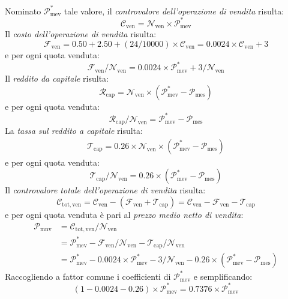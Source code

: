 \documentclass[12pt,a4paper]{article}
\newcommand{\CalcoloCostoOperazioneSim}[1]{\num{0,50} + \num{2,50} + \left(\num{24}/\num{10000}\right) \times{} #1}
\newcommand{\Nven}[1]{\mathcal{N}_{\textrm{ven}#1}}
\newcommand{\Pme}[1]{\mathcal{P}_{\mathrm{me}#1}}
\newcommand{\Pmes}[1]{\Pme{\mathrm{s}#1}}
\newcommand{\Pmnv}[1]{\mathcal{P}_{\mathrm{mnv}#1}}
\newcommand{\Plimmev}{\mathcal{P}_{\mathrm{mev}}^{*}}
\newcommand{\Cven}[1]{\mathcal{C}_{\mathrm{ven}#1}}
\newcommand{\Ctotven}[1]{\mathcal{C}_{\mathrm{tot,ven}#1}}
\newcommand{\Rcap}[1]{\mathcal{R}_{\mathrm{cap}#1}}
\newcommand{\Tredcap}[1]{\mathcal{T}_{\mathrm{cap}#1}}
\newcommand{\Fven}[1]{\mathcal{F}_{\mathrm{ven}#1}}
\begin{document}
Nominato \(\Plimmev{}\) tale valore, il \emph{controvalore dell'operazione di vendita} risulta:
\begin{equation*}
  \Cven{} = \Nven{} \times{} \Plimmev{}
\end{equation*}
Il \emph{costo dell'operazione di vendita} risulta:
\begin{equation*}
  \Fven{}
  = \CalcoloCostoOperazioneSim{\Cven{}}
  = \num{0,0024} \times{} \Cven{} + \num{3}
\end{equation*}
e per ogni quota venduta:
\begin{equation*}
  \Fven{} / \Nven{}
  = \num{0,0024} \times{} \Plimmev{} + \num{3} / \Nven{}
\end{equation*}
Il \emph{reddito da capitale} risulta:
\begin{equation*}
  \Rcap{}
  = \Nven{} \times{} \left(\Plimmev{} - \Pmes{}\right)
\end{equation*}
e per ogni quota venduta:
\begin{equation*}
  \Rcap{} / \Nven{} = \Plimmev{} - \Pmes{}
\end{equation*}
La \emph{tassa sul reddito a capitale} risulta:
\begin{align*}
  \Tredcap{} = \num{0,26} \times{} \Nven{} \times{} \left(\Plimmev{} - \Pmes{}\right)
\end{align*}
e per ogni quota venduta:
\begin{equation*}
  \Tredcap{} / \Nven{}
  = \num{0,26} \times{} \left(\Plimmev{} - \Pmes{}\right)
\end{equation*}
Il \emph{controvalore totale dell'operazione di vendita} risulta:
\begin{equation*}
  \Ctotven{}
  = \Cven{} - \left( \Fven{} + \Tredcap{} \right) =  \Cven{} - \Fven{} - \Tredcap{}
\end{equation*}
e per ogni quota venduta è pari al \emph{prezzo medio netto di vendita}:
\begin{align*}
  \Pmnv{}
  &= \Ctotven{} / \Nven{}
  \\
  &= \Plimmev{} - \Fven{} / \Nven{} - \Tredcap{} / \Nven{}
    \\
  &= \Plimmev{}
    - \num{0,0024} \times{} \Plimmev{} - \num{3} / \Nven{}
    - \num{0,26} \times{} \left(\Plimmev{} - \Pmes{}\right)
\end{align*}
Raccogliendo a fattor comune i coefficienti di \(\Plimmev{}\) e semplificando:
\begin{equation*}
  \left( 1 - \num{0,0024} - \num{0,26} \right) \times{} \Plimmev{}
  = \num{0,7376} \times{} \Plimmev{}
\end{equation*}
\end{document}

